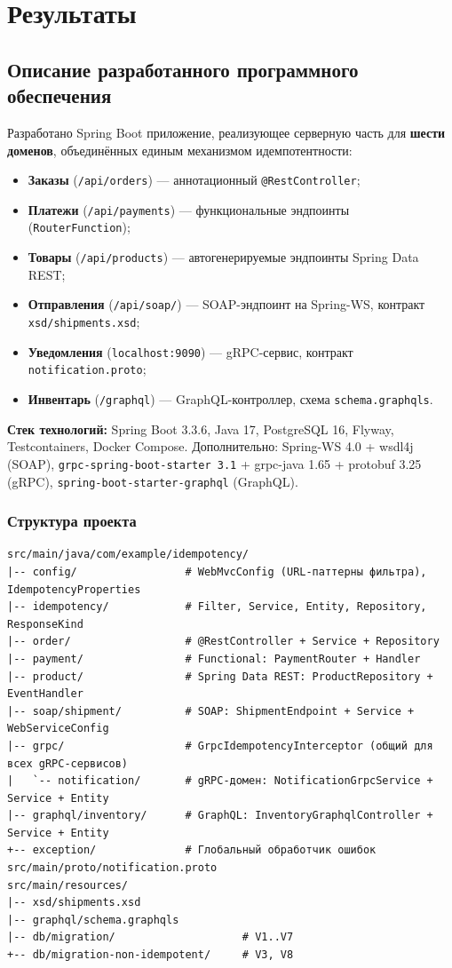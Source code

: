 \section{Результаты}

\subsection{Описание разработанного программного обеспечения}

Разработано Spring Boot приложение, реализующее серверную часть для \textbf{шести доменов}, объединённых единым механизмом идемпотентности:
\begin{itemize}
    \item \textbf{Заказы} (\texttt{/api/orders}) --- аннотационный \texttt{@RestController};
    \item \textbf{Платежи} (\texttt{/api/payments}) --- функциональные эндпоинты (\texttt{RouterFunction});
    \item \textbf{Товары} (\texttt{/api/products}) --- автогенерируемые эндпоинты Spring Data REST;
    \item \textbf{Отправления} (\texttt{/api/soap/}) --- SOAP-эндпоинт на Spring-WS, контракт \texttt{xsd/shipments.xsd};
    \item \textbf{Уведомления} (\texttt{localhost:9090}) --- gRPC-сервис, контракт \texttt{notification.proto};
    \item \textbf{Инвентарь} (\texttt{/graphql}) --- GraphQL-контроллер, схема \texttt{schema.graphqls}.
\end{itemize}

\textbf{Стек технологий:} Spring Boot 3.3.6, Java 17, PostgreSQL 16, Flyway, Testcontainers, Docker Compose. Дополнительно: Spring-WS 4.0 + wsdl4j (SOAP), \texttt{grpc-spring-boot-starter 3.1} + grpc-java 1.65 + protobuf 3.25 (gRPC), \texttt{spring-boot-starter-graphql} (GraphQL).

\subsubsection{Структура проекта}

\begin{verbatim}
src/main/java/com/example/idempotency/
|-- config/                 # WebMvcConfig (URL-паттерны фильтра), IdempotencyProperties
|-- idempotency/            # Filter, Service, Entity, Repository, ResponseKind
|-- order/                  # @RestController + Service + Repository
|-- payment/                # Functional: PaymentRouter + Handler
|-- product/                # Spring Data REST: ProductRepository + EventHandler
|-- soap/shipment/          # SOAP: ShipmentEndpoint + Service + WebServiceConfig
|-- grpc/                   # GrpcIdempotencyInterceptor (общий для всех gRPC-сервисов)
|   `-- notification/       # gRPC-домен: NotificationGrpcService + Service + Entity
|-- graphql/inventory/      # GraphQL: InventoryGraphqlController + Service + Entity
+-- exception/              # Глобальный обработчик ошибок
src/main/proto/notification.proto
src/main/resources/
|-- xsd/shipments.xsd
|-- graphql/schema.graphqls
|-- db/migration/                    # V1..V7
+-- db/migration-non-idempotent/     # V3, V8
\end{verbatim}


